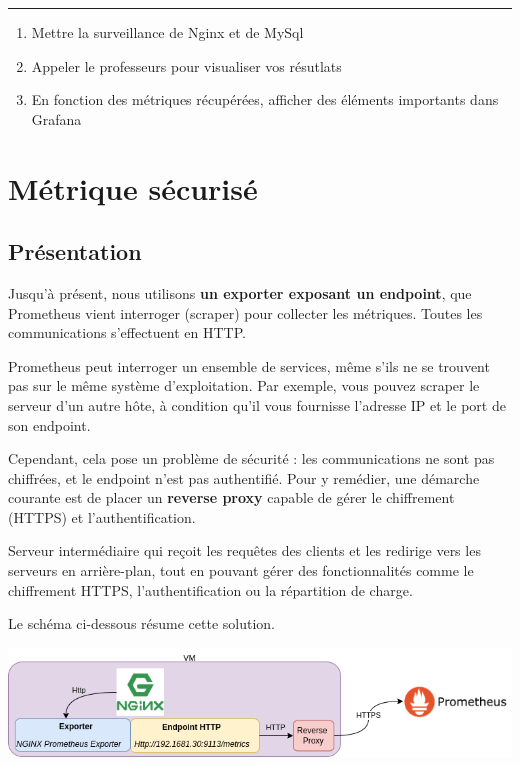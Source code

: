 \documentclass[french, 12pt]{article}%
\newcommand{\titreencadre}{Titre}
\newenvironment{encadre}[1]{\renewcommand{\titreencadre}{#1}
	\begin{mdframed}[style=encadrestyle]
	\vspace{0.5\baselineskip}
	}{%
	\end{mdframed}}
\begin{document}
\begin{center}
 \rule{0.75\linewidth}{1pt}
 \end{center}
\begin{enumerate}[resume]
\item Mettre la surveillance de Nginx et de MySql
\item Appeler le professeurs pour visualiser vos résutlats
\item En fonction des métriques récupérées, afficher des éléments importants dans Grafana
\end{enumerate}

\section{Métrique sécurisé}

\subsection{Présentation}

Jusqu'à présent, nous utilisons \textbf{un exporter exposant un endpoint}, que Prometheus vient interroger (scraper) pour collecter les métriques. Toutes les communications s’effectuent en HTTP.

Prometheus peut interroger un ensemble de services, même s'ils ne se trouvent pas sur le même système d'exploitation. Par exemple, vous pouvez scraper le serveur d'un autre hôte, à condition qu'il vous fournisse l'adresse IP et le port de son endpoint.

Cependant, cela pose un problème de sécurité : les communications ne sont pas chiffrées, et le endpoint n'est pas authentifié. Pour y remédier, une démarche courante est de placer un \textbf{reverse proxy} capable de gérer le chiffrement (HTTPS) et l'authentification. 


\begin{encadre}{reverse proxy}
Serveur intermédiaire qui reçoit les requêtes des clients et les redirige vers les serveurs en arrière-plan, tout en pouvant gérer des fonctionnalités comme le chiffrement HTTPS, l'authentification ou la répartition de charge.
\end{encadre}

Le schéma ci-dessous résume cette solution. 

\begin{center}
\includegraphics[scale=0.6]{./ressource/schemaHTTPSPrometheus.drawio.png}
\end{center}
\end{document}
